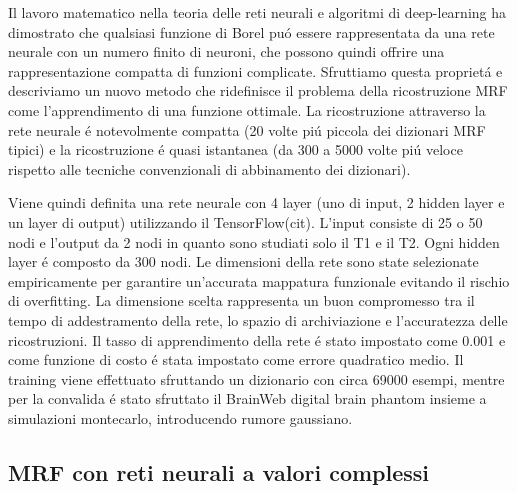 \documentclass[a4paper,10pt]{article}
\begin{document}
 Il lavoro matematico nella teoria delle reti neurali e algoritmi di deep-learning ha dimostrato che qualsiasi funzione di Borel pu\'o essere rappresentata da una rete neurale con un numero finito di neuroni, che possono quindi offrire una rappresentazione compatta di funzioni complicate. Sfruttiamo questa propriet\'a e descriviamo un nuovo metodo che ridefinisce il problema della ricostruzione MRF come l'apprendimento di una funzione ottimale. La ricostruzione attraverso la rete neurale \'e notevolmente compatta (20 volte pi\'u piccola dei dizionari MRF tipici) e la ricostruzione \'e quasi istantanea (da 300 a 5000 volte pi\'u veloce rispetto alle tecniche convenzionali di abbinamento dei dizionari).
 
 Viene quindi definita una rete neurale con 4 layer (uno di input, 2 hidden layer e un layer di output) utilizzando il TensorFlow(cit). L'input consiste di 25 o 50 nodi e l'output da 2 nodi in quanto sono studiati solo il T1 e il T2. Ogni hidden layer \'e composto da 300 nodi. Le dimensioni della rete sono state selezionate empiricamente per garantire un'accurata mappatura funzionale evitando il rischio di overfitting. La dimensione scelta rappresenta un buon compromesso tra il tempo di addestramento della rete, lo spazio di archiviazione e l'accuratezza delle ricostruzioni. Il tasso di apprendimento della rete \'e stato impostato come 0.001 e come funzione di costo \'e stata impostato come errore quadratico medio. Il training viene effettuato sfruttando un dizionario con circa 69000 esempi, mentre per la convalida \'e stato sfruttato il BrainWeb digital brain phantom insieme a simulazioni montecarlo, introducendo rumore  gaussiano.
 
 
 
 \subsection{MRF con reti neurali a valori complessi}
 
\end{document}

